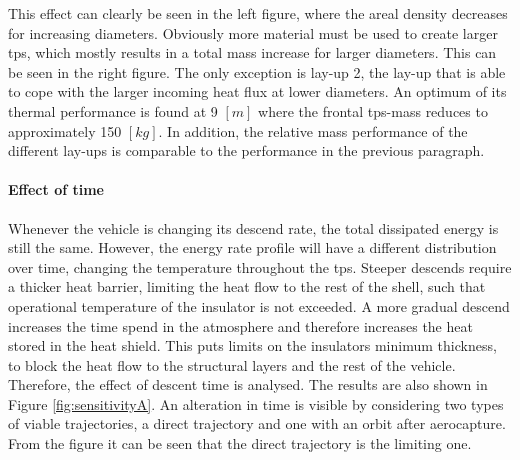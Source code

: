 This effect can clearly be seen in the left figure, where the areal density decreases for increasing diameters. Obviously more material must be used to create larger \gls{tps}, which mostly results in a total mass increase for larger diameters. This can be seen in the right figure. The only exception is lay-up 2, the lay-up that is able to cope with the larger incoming heat flux at lower diameters. An optimum of its thermal performance is found at 9 $ \left[ m \right]$ where the frontal \gls{tps}-mass reduces to approximately 150 $ \left[ kg \right]$. In addition, the relative mass performance of the different lay-ups is comparable to the performance in the previous paragraph.

\paragraph{Effect of time}
Whenever the vehicle is changing its descend rate, the total dissipated energy is still the same. However, the energy rate profile will have a different distribution over time, changing the temperature throughout the \gls{tps}. Steeper descends require a thicker heat barrier, limiting the heat flow to the rest of the shell, such that operational temperature of the insulator is not exceeded. A more gradual descend increases the time spend in the atmosphere and therefore increases the heat stored in the heat shield. This puts limits on the insulators minimum thickness, to block the heat flow to the structural layers and the rest of the vehicle. Therefore, the effect of descent time is analysed. The results are also shown in Figure \ref{fig:sensitivityA}. An alteration in time is visible by considering two types of viable trajectories, a direct trajectory and one with an orbit after aerocapture. From the figure it can be seen that the direct trajectory is the limiting one.